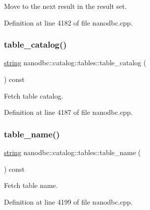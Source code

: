 Move to the next result in the result set. 



Definition at line 4182 of file nanodbc.\+cpp.

\mbox{\label{classnanodbc_1_1catalog_1_1tables_a1322c3bbfbd4500aef0c7655d172b5b0}} 
\subsubsection{\texorpdfstring{table\_catalog()}{table\_catalog()}}
{\footnotesize\ttfamily \mbox{\hyperlink{namespacenanodbc_abfc0ece56278e590911ec8352774c212}{string}} nanodbc\+::catalog\+::tables\+::table\+\_\+catalog (\begin{DoxyParamCaption}{ }\end{DoxyParamCaption}) const}



Fetch table catalog. 



Definition at line 4187 of file nanodbc.\+cpp.

\mbox{\label{classnanodbc_1_1catalog_1_1tables_a10115337bee64ff69a3808f12819f8a1}} 
\subsubsection{\texorpdfstring{table\_name()}{table\_name()}}
{\footnotesize\ttfamily \mbox{\hyperlink{namespacenanodbc_abfc0ece56278e590911ec8352774c212}{string}} nanodbc\+::catalog\+::tables\+::table\+\_\+name (\begin{DoxyParamCaption}{ }\end{DoxyParamCaption}) const}



Fetch table name. 



Definition at line 4199 of file nanodbc.\+cpp.

\mbox{\label{classnanodbc_1_1catalog_1_1tables_aceecf984de3a6cec736b2cf68f656042}} 
